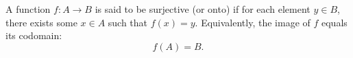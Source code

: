 A function $f: A \to B$ is said to be surjective (or onto) if for each element $y \in B$, there exists some $x \in A$ such that $f(x) = y$. Equivalently, the image of $f$ equals its codomain:
$$f(A) = B.$$
